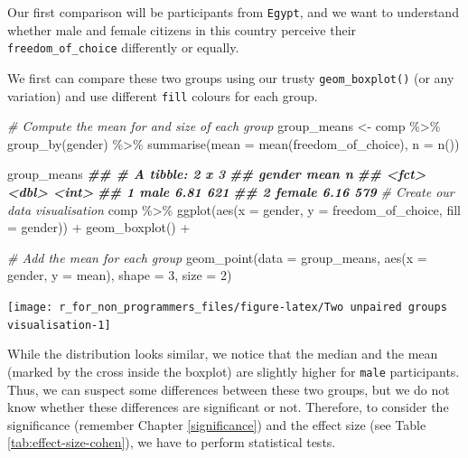 \documentclass[
]{book}
\newenvironment{Shaded}{\begin{snugshade}}{\end{snugshade}}
\newcommand{\AttributeTok}[1]{\textcolor[rgb]{0.77,0.63,0.00}{#1}}
\newcommand{\CommentTok}[1]{\textcolor[rgb]{0.56,0.35,0.01}{\textit{#1}}}
\newcommand{\DecValTok}[1]{\textcolor[rgb]{0.00,0.00,0.81}{#1}}
\newcommand{\DocumentationTok}[1]{\textcolor[rgb]{0.56,0.35,0.01}{\textbf{\textit{#1}}}}
\newcommand{\FunctionTok}[1]{\textcolor[rgb]{0.00,0.00,0.00}{#1}}
\newcommand{\NormalTok}[1]{#1}
\newcommand{\OtherTok}[1]{\textcolor[rgb]{0.56,0.35,0.01}{#1}}
\newcommand{\SpecialCharTok}[1]{\textcolor[rgb]{0.00,0.00,0.00}{#1}}
\begin{document}
Our first comparison will be participants from \texttt{Egypt}, and we want to understand whether male and female citizens in this country perceive their \texttt{freedom\_of\_choice} differently or equally.

We first can compare these two groups using our trusty \texttt{geom\_boxplot()} (or any variation) and use different \texttt{fill} colours for each group.

\begin{Shaded}
\begin{Highlighting}[]
\CommentTok{\# Compute the mean for and size of each group}
\NormalTok{group\_means }\OtherTok{\textless{}{-}}\NormalTok{ comp }\SpecialCharTok{\%\textgreater{}\%}
  \FunctionTok{group\_by}\NormalTok{(gender) }\SpecialCharTok{\%\textgreater{}\%}
  \FunctionTok{summarise}\NormalTok{(}\AttributeTok{mean =} \FunctionTok{mean}\NormalTok{(freedom\_of\_choice),}
            \AttributeTok{n =} \FunctionTok{n}\NormalTok{())}

\NormalTok{group\_means}
\DocumentationTok{\#\# \# A tibble: 2 x 3}
\DocumentationTok{\#\#   gender  mean     n}
\DocumentationTok{\#\#   \textless{}fct\textgreater{}  \textless{}dbl\textgreater{} \textless{}int\textgreater{}}
\DocumentationTok{\#\# 1 male    6.81   621}
\DocumentationTok{\#\# 2 female  6.16   579}
\CommentTok{\# Create our data visualisation}
\NormalTok{comp }\SpecialCharTok{\%\textgreater{}\%}
  \FunctionTok{ggplot}\NormalTok{(}\FunctionTok{aes}\NormalTok{(}\AttributeTok{x =}\NormalTok{ gender, }\AttributeTok{y =}\NormalTok{ freedom\_of\_choice, }\AttributeTok{fill =}\NormalTok{ gender)) }\SpecialCharTok{+}
  \FunctionTok{geom\_boxplot}\NormalTok{() }\SpecialCharTok{+}

  \CommentTok{\# Add the mean for each group}
  \FunctionTok{geom\_point}\NormalTok{(}\AttributeTok{data =}\NormalTok{ group\_means,}
             \FunctionTok{aes}\NormalTok{(}\AttributeTok{x =}\NormalTok{ gender, }\AttributeTok{y =}\NormalTok{ mean),}
             \AttributeTok{shape =} \DecValTok{3}\NormalTok{,}
             \AttributeTok{size =} \DecValTok{2}\NormalTok{)}
\end{Highlighting}
\end{Shaded}

\begin{center}\texttt{[image: r\_for\_non\_programmers\_files/figure-latex/Two unpaired groups visualisation-1]} \end{center}

While the distribution looks similar, we notice that the median and the mean (marked by the cross inside the boxplot) are slightly higher for \texttt{male} participants. Thus, we can suspect some differences between these two groups, but we do not know whether these differences are significant or not. Therefore, to consider the significance (remember Chapter \ref{significance}) and the effect size (see Table \ref{tab:effect-size-cohen}), we have to perform statistical tests.
\end{document}
